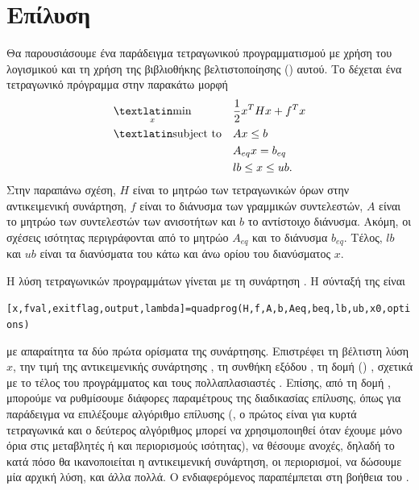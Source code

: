 \section{Επίλυση}
Θα παρουσιάσουμε ένα παράδειγμα τετραγωνικού προγραμματισμού με χρήση του
λογισμικού \href{https://www.mathworks.com/products/matlab/}{}
και τη χρήση της βιβλιοθήκης βελτιστοποίησης () αυτού.
Το  δέχεται ένα τετραγωνικό πρόγραμμα στην παρακάτω μορφή
\begin{equation}\label{eq:qp_mat}
    \begin{aligned}
        & \underset{x}{\text{\tl{min}}} & &
        \dfrac{1}{2}x^THx + f^T x \\
        & \text{\tl{subject to}} & & Ax \leq b \\
        &&& A_{eq} x = b_{eq} \\
        &&& lb \le x \le ub.
    \end{aligned}
\end{equation}
Στην παραπάνω σχέση, $H$ είναι το μητρώο των τετραγωνικών όρων στην
αντικειμενική συνάρτηση, $f$ είναι το διάνυσμα των γραμμικών συντελεστών,
$A$ είναι το μητρώο των συντελεστών των ανισοτήτων και $b$ το
αντίστοιχο διάνυσμα. Ακόμη, οι σχέσεις ισότητας περιγράφονται από το
μητρώο $A_{eq}$ και το διάνυσμα $b_{eq}$. Τέλος, $lb$ και $ub$ είναι
τα διανύσματα του κάτω και άνω ορίου του διανύσματος $x$.

Η λύση τετραγωνικών προγραμμάτων γίνεται με τη συνάρτηση
. Η σύνταξή της είναι
\begin{otherlanguage}{english}
    \begin{center}
        \texttt{[x,fval,exitflag,output,lambda]=quadprog(H,f,A,b,Aeq,beq,lb,ub,x0,options)}
    \end{center}
\end{otherlanguage}
με απαραίτητα τα δύο πρώτα ορίσματα της συνάρτησης. Επιστρέφει τη βέλτιστη
λύση $x$, την τιμή της αντικειμενικής συνάρτησης , τη συνθήκη
εξόδου , τη δομή () , σχετικά με
το τέλος του  προγράμματος και τους πολλαπλασιαστές 
. Επίσης, από τη δομή , μπορούμε να ρυθμίσουμε
διάφορες παραμέτρους της διαδικασίας επίλυσης, όπως για παράδειγμα να επιλέξουμε
αλγόριθμο επίλυσης (, ο
    πρώτος είναι για κυρτά τετραγωνικά και ο δεύτερος αλγόριθμος μπορεί να
χρησιμοποιηθεί όταν έχουμε μόνο όρια στις μεταβλητές ή και περιορισμούς ισότητας),
να θέσουμε ανοχές, δηλαδή το κατά πόσο θα ικανοποιείται η αντικειμενική συνάρτηση,
οι περιορισμοί, να δώσουμε μία αρχική λύση, και άλλα πολλά. Ο ενδιαφερόμενος
παραπέμπεται στη βοήθεια του .

